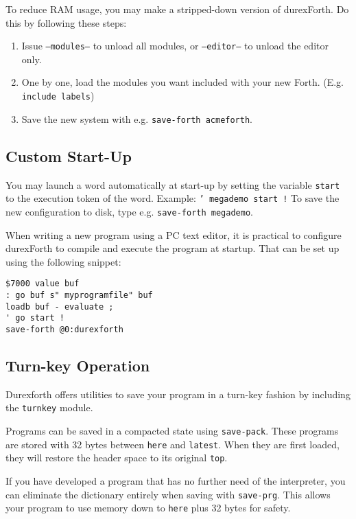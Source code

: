 To reduce RAM usage, you may make a stripped-down version of durexForth. Do this by following these steps:

\begin{enumerate}
\item Issue \texttt{---modules---} to unload all modules, or \texttt{---editor---} to unload the editor only.
\item One by one, load the modules you want included with your new Forth. (E.g. \texttt{include labels})
\item Save the new system with e.g. \texttt{save-forth acmeforth}.
\end{enumerate}

\subsection{Custom Start-Up}

You may launch a word automatically at start-up by setting the variable \texttt{start} to the execution token of the word.  Example: \texttt{' megademo start !} To save the new configuration to disk, type e.g. \texttt{save-forth megademo}.

When writing a new program using a PC text editor, it is practical to configure durexForth to compile and execute the program at startup. That can be set up using the following snippet:

\begin{verbatim}
$7000 value buf
: go buf s" myprogramfile" buf
loadb buf - evaluate ;
' go start !
save-forth @0:durexforth
\end{verbatim}

\subsection{Turn-key Operation}

Durexforth offers utilities to save your program in a turn-key fashion by including the \texttt{turnkey} module.

Programs can be saved in a compacted state using \texttt{save-pack}. These programs are stored with 32 bytes between \texttt{here} and \texttt{latest}. When they are first loaded, they will restore the header space to its original \texttt{top}.

If you have developed a program that has no further need of the interpreter, you can eliminate the dictionary entirely when saving with \texttt{save-prg}. This allows your program to use memory down to \texttt{here} plus 32 bytes for safety. 

